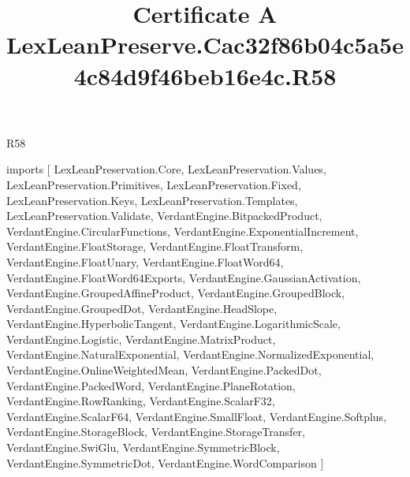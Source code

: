 \begin{lexlean}{R58}
\title{Certificate A LexLeanPreserve.Cac32f86b04c5a5e4c84d9f46beb16e4c.R58}
\begin{coremodule}
imports [
  LexLeanPreservation.Core,
  LexLeanPreservation.Values,
  LexLeanPreservation.Primitives,
  LexLeanPreservation.Fixed,
  LexLeanPreservation.Keys,
  LexLeanPreservation.Templates,
  LexLeanPreservation.Validate,
  VerdantEngine.BitpackedProduct,
  VerdantEngine.CircularFunctions,
  VerdantEngine.ExponentialIncrement,
  VerdantEngine.FloatStorage,
  VerdantEngine.FloatTransform,
  VerdantEngine.FloatUnary,
  VerdantEngine.FloatWord64,
  VerdantEngine.FloatWord64Exports,
  VerdantEngine.GaussianActivation,
  VerdantEngine.GroupedAffineProduct,
  VerdantEngine.GroupedBlock,
  VerdantEngine.GroupedDot,
  VerdantEngine.HeadSlope,
  VerdantEngine.HyperbolicTangent,
  VerdantEngine.LogarithmicScale,
  VerdantEngine.Logistic,
  VerdantEngine.MatrixProduct,
  VerdantEngine.NaturalExponential,
  VerdantEngine.NormalizedExponential,
  VerdantEngine.OnlineWeightedMean,
  VerdantEngine.PackedDot,
  VerdantEngine.PackedWord,
  VerdantEngine.PlaneRotation,
  VerdantEngine.RowRanking,
  VerdantEngine.ScalarF32,
  VerdantEngine.ScalarF64,
  VerdantEngine.SmallFloat,
  VerdantEngine.Softplus,
  VerdantEngine.StorageBlock,
  VerdantEngine.StorageTransfer,
  VerdantEngine.SwiGlu,
  VerdantEngine.SymmetricBlock,
  VerdantEngine.SymmetricDot,
  VerdantEngine.WordComparison
]


\end{coremodule}
\end{lexlean}
